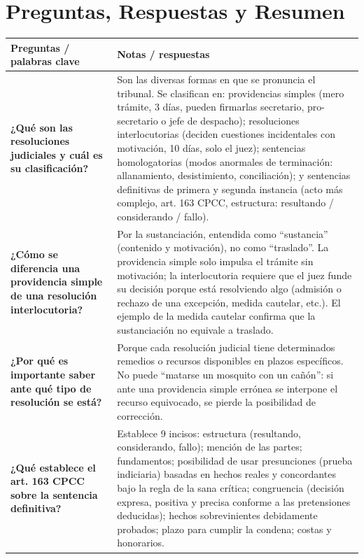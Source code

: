 \documentclass[12pt,oneside]{book}
\begin{document}
\section{Preguntas, Respuestas y Resumen}

\begin{table}[H]
\centering
\begin{tabularx}{\textwidth}{
    >{\raggedright\arraybackslash}p{}
    >{\raggedright\arraybackslash}X
}
\toprule
\textbf{Preguntas / palabras clave} &
\textbf{Notas / respuestas} \\
\midrule

\textbf{¿Qué son las resoluciones judiciales y cuál es su clasificación?} &
Son las diversas formas en que se pronuncia el tribunal. Se clasifican en: providencias simples (mero trámite, 3 días, pueden firmarlas secretario, pro-secretario o jefe de despacho); resoluciones interlocutorias (deciden cuestiones incidentales con motivación, 10 días, solo el juez); sentencias homologatorias (modos anormales de terminación: allanamiento, desistimiento, conciliación); y sentencias definitivas de primera y segunda instancia (acto más complejo, art. 163 CPCC, estructura: resultando / considerando / fallo). \\

\textbf{¿Cómo se diferencia una providencia simple de una resolución interlocutoria?} &
Por la sustanciación, entendida como ``sustancia'' (contenido y motivación), no como ``traslado''. La providencia simple solo impulsa el trámite sin motivación; la interlocutoria requiere que el juez funde su decisión porque está resolviendo algo (admisión o rechazo de una excepción, medida cautelar, etc.). El ejemplo de la medida cautelar confirma que la sustanciación no equivale a traslado. \\

\textbf{¿Por qué es importante saber ante qué tipo de resolución se está?} &
Porque cada resolución judicial tiene determinados remedios o recursos disponibles en plazos específicos. No puede ``matarse un mosquito con un cañón'': si ante una providencia simple errónea se interpone el recurso equivocado, se pierde la posibilidad de corrección. \\

\textbf{¿Qué establece el art. 163 CPCC sobre la sentencia definitiva?} &
Establece 9 incisos: estructura (resultando, considerando, fallo); mención de las partes; fundamentos; posibilidad de usar presunciones (prueba indiciaria) basadas en hechos reales y concordantes bajo la regla de la sana crítica; congruencia (decisión expresa, positiva y precisa conforme a las pretensiones deducidas); hechos sobrevinientes debidamente probados; plazo para cumplir la condena; costas y honorarios. \\


\end{tabularx}
\end{table}
\end{document}
